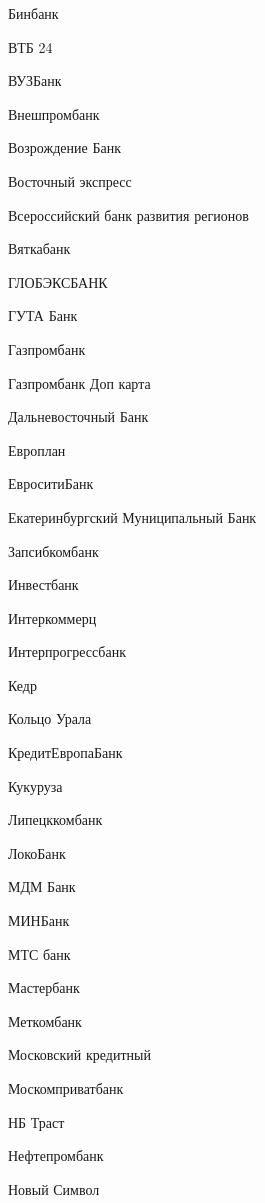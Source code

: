 \documentclass[a4paper,10pt,russian]{sphinxmanual}
\begin{document}
\sphinxAtStartPar
Бинбанк

\sphinxAtStartPar
ВТБ 24

\sphinxAtStartPar
ВУЗ\sphinxhyphen{}Банк

\sphinxAtStartPar
Внешпромбанк

\sphinxAtStartPar
Возрождение Банк

\sphinxAtStartPar
Восточный экспресс

\sphinxAtStartPar
Всероссийский банк развития регионов

\sphinxAtStartPar
Вятка\sphinxhyphen{}банк

\sphinxAtStartPar
ГЛОБЭКСБАНК

\sphinxAtStartPar
ГУТА Банк

\sphinxAtStartPar
Газпромбанк

\sphinxAtStartPar
Газпромбанк Доп карта

\sphinxAtStartPar
Дальневосточный Банк

\sphinxAtStartPar
Европлан

\sphinxAtStartPar
ЕвроситиБанк

\sphinxAtStartPar
Екатеринбургский Муниципальный Банк

\sphinxAtStartPar
Запсибкомбанк

\sphinxAtStartPar
Инвестбанк

\sphinxAtStartPar
Интеркоммерц

\sphinxAtStartPar
Интерпрогрессбанк

\sphinxAtStartPar
Кедр

\sphinxAtStartPar
Кольцо Урала

\sphinxAtStartPar
КредитЕвропаБанк

\sphinxAtStartPar
Кукуруза

\sphinxAtStartPar
Липецккомбанк

\sphinxAtStartPar
ЛокоБанк

\sphinxAtStartPar
МДМ Банк

\sphinxAtStartPar
МИНБанк

\sphinxAtStartPar
МТС банк

\sphinxAtStartPar
Мастербанк

\sphinxAtStartPar
Меткомбанк

\sphinxAtStartPar
Московский кредитный

\sphinxAtStartPar
Москомприватбанк

\sphinxAtStartPar
НБ Траст

\sphinxAtStartPar
Нефтепромбанк

\sphinxAtStartPar
Новый Символ
\end{document}
